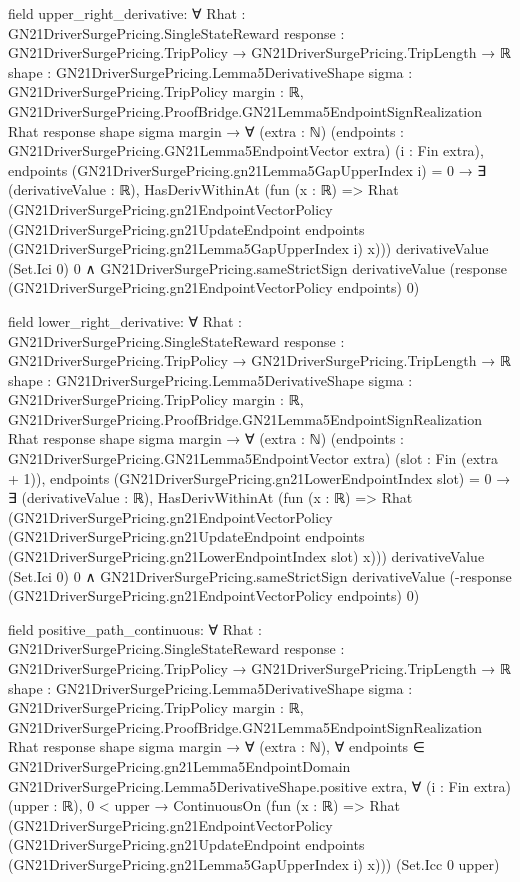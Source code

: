 \documentclass[10pt]{article}
\begin{document}
\begin{ReviewVerbatim}
field upper_right_derivative:
∀ {Rhat : GN21DriverSurgePricing.SingleStateReward}
  {response : GN21DriverSurgePricing.TripPolicy → GN21DriverSurgePricing.TripLength → ℝ}
  {shape : GN21DriverSurgePricing.Lemma5DerivativeShape} {sigma : GN21DriverSurgePricing.TripPolicy} {margin : ℝ},
  GN21DriverSurgePricing.ProofBridge.GN21Lemma5EndpointSignRealization Rhat response shape sigma margin →
    ∀ (extra : ℕ) (endpoints : GN21DriverSurgePricing.GN21Lemma5EndpointVector extra) (i : Fin extra),
      endpoints (GN21DriverSurgePricing.gn21Lemma5GapUpperIndex i) = 0 →
        ∃ (derivativeValue : ℝ),
          HasDerivWithinAt
              (fun (x : ℝ) =>
                Rhat
                  (GN21DriverSurgePricing.gn21EndpointVectorPolicy
                    (GN21DriverSurgePricing.gn21UpdateEndpoint endpoints
                      (GN21DriverSurgePricing.gn21Lemma5GapUpperIndex i) x)))
              derivativeValue (Set.Ici 0) 0 ∧
            GN21DriverSurgePricing.sameStrictSign derivativeValue
              (response (GN21DriverSurgePricing.gn21EndpointVectorPolicy endpoints) 0)

field lower_right_derivative:
∀ {Rhat : GN21DriverSurgePricing.SingleStateReward}
  {response : GN21DriverSurgePricing.TripPolicy → GN21DriverSurgePricing.TripLength → ℝ}
  {shape : GN21DriverSurgePricing.Lemma5DerivativeShape} {sigma : GN21DriverSurgePricing.TripPolicy} {margin : ℝ},
  GN21DriverSurgePricing.ProofBridge.GN21Lemma5EndpointSignRealization Rhat response shape sigma margin →
    ∀ (extra : ℕ) (endpoints : GN21DriverSurgePricing.GN21Lemma5EndpointVector extra) (slot : Fin (extra + 1)),
      endpoints (GN21DriverSurgePricing.gn21LowerEndpointIndex slot) = 0 →
        ∃ (derivativeValue : ℝ),
          HasDerivWithinAt
              (fun (x : ℝ) =>
                Rhat
                  (GN21DriverSurgePricing.gn21EndpointVectorPolicy
                    (GN21DriverSurgePricing.gn21UpdateEndpoint endpoints
                      (GN21DriverSurgePricing.gn21LowerEndpointIndex slot) x)))
              derivativeValue (Set.Ici 0) 0 ∧
            GN21DriverSurgePricing.sameStrictSign derivativeValue
              (-response (GN21DriverSurgePricing.gn21EndpointVectorPolicy endpoints) 0)

field positive_path_continuous:
∀ {Rhat : GN21DriverSurgePricing.SingleStateReward}
  {response : GN21DriverSurgePricing.TripPolicy → GN21DriverSurgePricing.TripLength → ℝ}
  {shape : GN21DriverSurgePricing.Lemma5DerivativeShape} {sigma : GN21DriverSurgePricing.TripPolicy} {margin : ℝ},
  GN21DriverSurgePricing.ProofBridge.GN21Lemma5EndpointSignRealization Rhat response shape sigma margin →
    ∀ (extra : ℕ),
      ∀
        endpoints ∈
          GN21DriverSurgePricing.gn21Lemma5EndpointDomain GN21DriverSurgePricing.Lemma5DerivativeShape.positive extra,
        ∀ (i : Fin extra) (upper : ℝ),
          0 < upper →
            ContinuousOn
              (fun (x : ℝ) =>
                Rhat
                  (GN21DriverSurgePricing.gn21EndpointVectorPolicy
                    (GN21DriverSurgePricing.gn21UpdateEndpoint endpoints
                      (GN21DriverSurgePricing.gn21Lemma5GapUpperIndex i) x)))
              (Set.Icc 0 upper)


\end{ReviewVerbatim}
\end{document}
